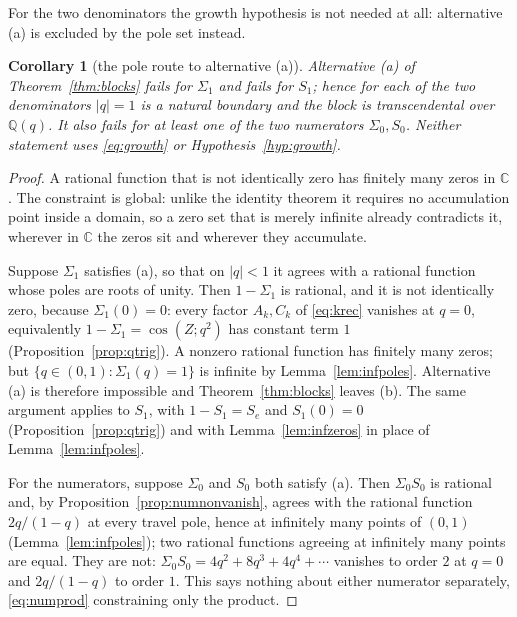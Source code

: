 \documentclass[11pt]{article}
\theoremstyle{plain}
\newtheorem{corollary}[theorem]{Corollary}
\theoremstyle{definition}
\theoremstyle{remark}
\newcommand{\Q}{\mathbb{Q}}
\newcommand{\C}{\mathbb{C}}
\begin{document}
For the two denominators the growth hypothesis is not needed at all: alternative \textup{(a)} is
excluded by the pole set instead.

\begin{corollary}[the pole route to alternative \textup{(a)}]\label{cor:polepath}
Alternative \textup{(a)} of Theorem~\ref{thm:blocks} fails for $\Sigma_1$ and fails for $S_1$;
hence for each of the two denominators $|q|=1$ is a natural boundary and the block is transcendental
over $\Q(q)$. It also fails for at least one of the two numerators $\Sigma_0,S_0$. Neither
statement uses \eqref{eq:growth} or Hypothesis~\ref{hyp:growth}.
\end{corollary}

\begin{proof}
A rational function that is not identically zero has finitely many zeros in $\C$. The constraint is
global: unlike the identity theorem it requires no accumulation point inside a domain, so a zero set
that is merely infinite already contradicts it, wherever in $\C$ the zeros sit and wherever they
accumulate.

Suppose $\Sigma_1$ satisfies \textup{(a)}, so that on $|q|<1$ it agrees with a rational function
whose poles are roots of unity. Then $1-\Sigma_1$ is rational, and it is not identically zero,
because $\Sigma_1(0)=0$: every factor $A_k,C_k$ of \eqref{eq:krec} vanishes at $q=0$, equivalently
$1-\Sigma_1=\cos(Z;q^2)$ has constant term $1$ (Proposition~\ref{prop:qtrig}). A nonzero rational
function has finitely many zeros; but $\{q\in(0,1):\Sigma_1(q)=1\}$ is infinite by
Lemma~\ref{lem:infpoles}. Alternative \textup{(a)} is therefore impossible and
Theorem~\ref{thm:blocks} leaves \textup{(b)}. The same argument applies to $S_1$, with
$1-S_1=S_e$ and $S_1(0)=0$ (Proposition~\ref{prop:qtrig}) and with Lemma~\ref{lem:infzeros} in place
of Lemma~\ref{lem:infpoles}.

For the numerators, suppose $\Sigma_0$ and $S_0$ both satisfy \textup{(a)}. Then $\Sigma_0S_0$ is
rational and, by Proposition~\ref{prop:numnonvanish}, agrees with the rational function
$2q/(1-q)$ at every travel pole, hence at infinitely many points of $(0,1)$
(Lemma~\ref{lem:infpoles}); two rational functions
agreeing at infinitely many points are equal. They are not: $\Sigma_0S_0=4q^2+8q^3+4q^4+\cdots$
vanishes to order $2$ at $q=0$ and $2q/(1-q)$ to order $1$. This says nothing about either numerator
separately, \eqref{eq:numprod} constraining only the product.
\end{proof}
\end{document}
